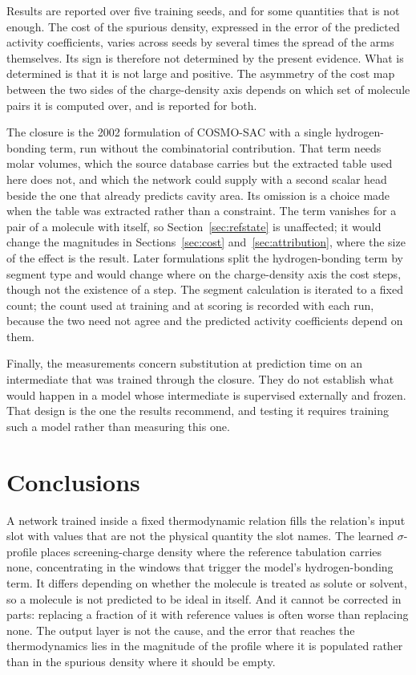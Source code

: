 Results are reported over five training seeds, and for some quantities that is not enough. The cost of the spurious density, expressed in the error of the predicted activity coefficients, varies across seeds by several times the spread of the arms themselves. Its sign is therefore not determined by the present evidence. What is determined is that it is not large and positive. The
asymmetry of the cost map between the two sides of the charge-density axis depends on which set of
molecule pairs it is computed over, and is reported for both.

The closure is the 2002 formulation of COSMO-SAC with a single hydrogen-bonding term, run without
the combinatorial contribution. That term needs molar volumes, which the source database carries
but the extracted table used here does not, and which the network could supply with a second scalar
head beside the one that already predicts cavity area. Its omission is a choice made when the table
was extracted rather than a constraint. The term vanishes for a pair of a molecule with itself, so
Section~\ref{sec:refstate} is unaffected; it would change the magnitudes in
Sections~\ref{sec:cost} and~\ref{sec:attribution}, where the size of the effect is the result. Later
formulations split the hydrogen-bonding term by segment type and would change where on the
charge-density axis the cost steps, though not the existence of a step. The segment calculation is
iterated to a fixed count; the count used at training and at scoring is recorded with each run,
because the two need not agree and the predicted activity coefficients depend on them.

Finally, the measurements concern substitution at prediction time on an intermediate that was
trained through the closure. They do not establish what would happen in a model whose intermediate
is supervised externally and frozen. That design is the one the results recommend, and testing it
requires training such a model rather than measuring this one.

\section{Conclusions}
\label{sec:conclusions}

A network trained inside a fixed thermodynamic relation fills the relation's input slot with values
that are not the physical quantity the slot names. The learned $\sigma$-profile places
screening-charge density where the reference tabulation carries none, concentrating in the windows
that trigger the model's hydrogen-bonding term. It differs depending on whether the molecule is treated as solute or solvent, so a molecule is not predicted to be ideal in itself. And it cannot be corrected in parts: replacing a fraction of it with reference values is often worse than replacing none. The output layer is not the cause, and the error that reaches the thermodynamics
lies in the magnitude of the profile where it is populated rather than in the spurious density
where it should be empty.

